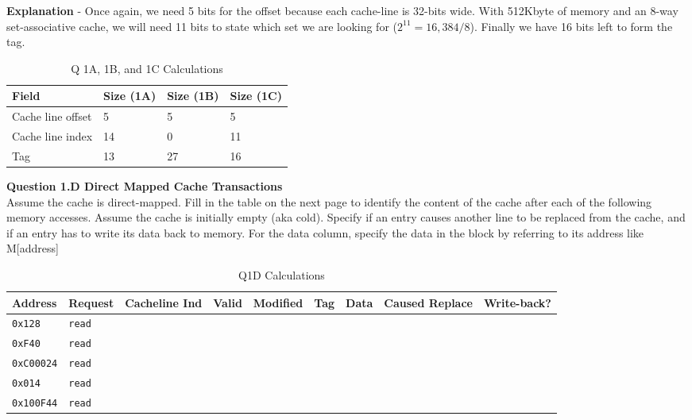 \documentclass[a4paper,11pt]{article}
\newcommand{\T}{\texttt}
\begin{document}
\textbf{Explanation} - Once again, we need 5 bits for the offset because each cache-line is 32-bits wide. With 512Kbyte of memory and an 8-way set-associative cache, we will need 11 bits to state which set we are looking for ($2^{11} =16,384/8$). Finally we have 16 bits left to form the tag.

\begin{table}[H]
\caption{Q 1A, 1B, and 1C Calculations} \label{tab:q1calc} 
\begin{center}
\begin{tabular}{| l | l | l | l |} \hline 
   Field              &  Size (1A) & Size (1B) & Size (1C)     \\ \hline
   Cache line offset  &  5         &   5       &   5           \\ \hline
   Cache line index   &  14        &   0       &   11          \\ \hline
   Tag                &  13        &   27      &   16          \\ \hline
\end{tabular}
\end{center}
\end{table}



\item \textbf{Question 1.D Direct Mapped Cache Transactions } \\

Assume the cache is direct-mapped. Fill in the table on the next page to identify the content of the cache after each of the following memory accesses. Assume the cache is initially empty (aka cold). Specify if an entry causes another line to be replaced from the cache, and if an entry has to write its data back to memory. For the data column, specify the data in the block by referring to its address like M[address]


\begin{table}[H]
\caption{Q1D Calculations} \label{tab:q1calc} 
\begin{center}
\begin{tabular}{| l | l | l | l | l | l | l | l | l |}
\hline
Address  &  Request  & Cacheline Ind & Valid & Modified & Tag & Data & Caused Replace & Write-back?    \\ \hline
\T{0x128}  &  \T{read} & \T{  } & \T{} & \T{} & \T{} & \T{} & \T{} & \T{}    \\ \hline
\T{0xF40}  &  \T{read} & \T{  } & \T{} & \T{} & \T{} & \T{} & \T{} & \T{}    \\ \hline
\T{0xC00024}  &  \T{read} & \T{  } & \T{} & \T{} & \T{} & \T{} & \T{} & \T{}    \\ \hline
\T{0x014}  &  \T{read} & \T{  } & \T{} & \T{} & \T{} & \T{} & \T{} & \T{}    \\ \hline
\T{0x100F44}  &  \T{read} & \T{  } & \T{} & \T{} & \T{} & \T{} & \T{} & \T{}    \\ \hline
\end{tabular}
\end{center}
\end{table}
\end{document}
